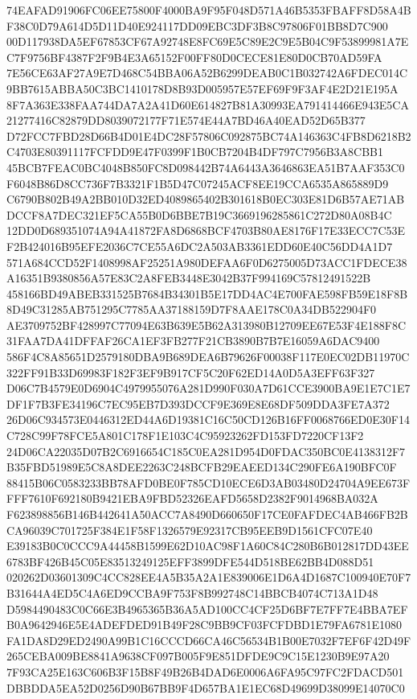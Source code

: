 \documentclass[UTF8,fontset=fandol,zihao=-4,a4paper]{ctexart}
\begin{document}
{{74EAFAD91906FC06EE75800F4000BA9F95F048D571A46B5353FBAFF8D58A4BF38C0D79A614D5D11D40E924117DD09EBC3DF3B8C97806F01BB8D7C900
00D117938DA5EF67853CF67A92748E8FC69E5C89E2C9E5B04C9F53899981A7EC7F9756BF4387F2F9B4E3A65152F00FF80D0CECE81E80D0CB70AD59FA
7E56CE63AF27A9E7D468C54BBA06A52B6299DEAB0C1B032742A6FDEC014C9BB7615ABBA50C3BC1410178D8B93D005957E57EF69F9F3AF4E2D21E195A
8F7A363E338FAA744DA7A2A41D60E614827B81A30993EA791414466E943E5CA21277416C82879DD8039072177F71E574E44A7BD46A40EAD52D65B377
D72FCC7FBD28D66B4D01E4DC28F57806C092875BC74A146363C4FB8D6218B2C4703E80391117FCFDD9E47F0399F1B0CB7204B4DF797C7956B3A8CBB1
45BCB7FEAC0BC4048B850FC8D098442B74A6443A3646863EA51B7AAF353C0F6048B86D8CC736F7B3321F1B5D47C07245ACF8EE19CCA6535A865889D9
C6790B802B49A2BB010D32ED4089865402B301618B0EC303E81D6B57AE71ABDCCF8A7DEC321EF5CA55B0D6BBE7B19C3669196285861C272D80A08B4C
12DD0D689351074A94A41872FA8D6868BCF4703B80AE8176F17E33ECC7C53EF2B424016B95EFE2036C7CE55A6DC2A503AB3361EDD60E40C56DD4A1D7
571A684CCD52F1408998AF25251A980DEFAA6F0D6275005D73ACC1FDECE38A16351B9380856A57E83C2A8FEB3448E3042B37F994169C57812491522B
458166BD49ABEB331525B7684B34301B5E17DD4AC4E700FAE598FB59E18F8B8D49C31285AB751295C7785AA37188159D7F8AAE178C0A34DB522904F0
AE3709752BF428997C77094E63B639E5B62A313980B12709EE67E53F4E188F8C31FAA7DA41DFFAF26CA1EF3FB277F21CB3890B7B7E16059A6DAC9400
586F4C8A85651D2579180DBA9B689DEA6B79626F00038F117E0EC02DB11970C322FF91B33D69983F182F3EF9B917CF5C20F62ED14A0D5A3EFF63F327
D06C7B4579E0D6904C4979955076A281D990F030A7D61CCE3900BA9E1E7C1E7DF1F7B3FE34196C7EC95EB7D393DCCF9E369E8E68DF509DDA3FE7A372
26D06C934573E0446312ED44A6D19381C16C50CD126B16FF0068766ED0E30F14C728C99F78FCE5A801C178F1E103C4C95923262FD153FD7220CF13F2
24D06CA22035D07B2C6916654C185C0EA281D954D0FDAC350BC0E4138312F7B35FBD51989E5C8A8DEE2263C248BCFB29EAEED134C290FE6A190BFC0F
88415B06C0583233BB78AFD0BE0F785CD10ECE6D3AB03480D24704A9EE673FFFF7610F692180B9421EBA9FBD52326EAFD5658D2382F9014968BA032A
F623898856B146B442641A50ACC7A8490D660650F17CE0FAFDEC4AB466FB2BCA96039C701725F384E1F58F1326579E92317CB95EEB9D1561CFC07E40
E39183B0C0CCC9A44458B1599E62D10AC98F1A60C84C280B6B012817DD43EE6783BF426B45C05E83513249125EFF3899DFE544D518BE62BB4D088D51
020262D03601309C4CC828EE4A5B35A2A1E839006E1D6A4D1687C100940E70F7B31644A4ED5C4A6ED9CCBA9F753F8B992748C14BBCB4074C713A1D48
D5984490483C0C66E3B4965365B36A5AD100CC4CF25D6BF7E7FF7E4BBA7EFB0A9642946E5E4ADEFDED91B49F28C9BB9CF03FCFDBD1E79FA6781E1080
FA1DA8D29ED2490A99B1C16CCCD66CA46C56534B1B00E7032F7EF6F42D49F265CEBA009BE8841A9638CF097B005F9E851DFDE9C9C15E1230B9E97A20
7F93CA25E163C606B3F15B8F49B26B4DAD6E0006A6FA95C97FC2FDACD501DBBDDA5EA52D0256D90B67BB9F4D657BA1E1EC68D49699D38099E14070C0
}}
\end{document}
